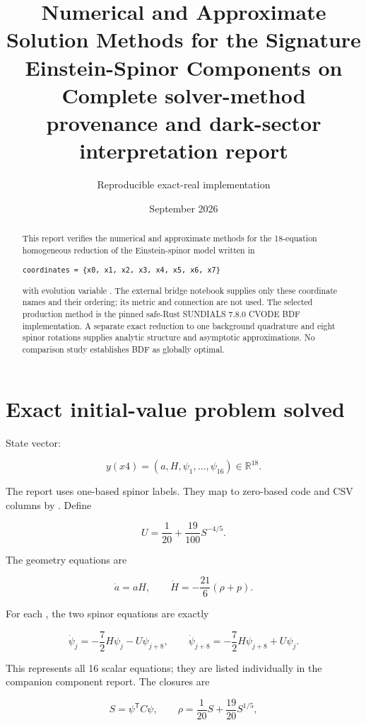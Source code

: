 \documentclass[11pt]{article}
\title{Numerical and Approximate Solution Methods for the Signature \texttt{\detokenize{(4,4)}} Einstein-Spinor Components on \texttt{\detokenize{{x0,...,x7}}}\\[0.5em]\large Complete solver-method provenance and dark-sector interpretation report}
\author{Reproducible exact-real implementation}
\date{September 2026}
\begin{document}
\maketitle
\tableofcontents
\newpage
\begin{abstract}
This report verifies the numerical and approximate methods for the 18-equation homogeneous reduction of the Einstein-spinor model written in

\begin{Verbatim}[fontsize=\small]
coordinates = {x0, x1, x2, x3, x4, x5, x6, x7}
\end{Verbatim}

with evolution variable \texttt{}. The external bridge notebook supplies only these coordinate names and their ordering; its metric and connection are not used. The selected production method is the pinned safe-Rust SUNDIALS 7.8.0 CVODE BDF implementation. A separate exact reduction to one background quadrature and eight spinor rotations supplies analytic structure and asymptotic approximations. No comparison study establishes BDF as globally optimal.

\end{abstract}

\section{Exact initial-value problem solved}

State vector:

\[
y(x4)=(a,H,\psi_1,\ldots,\psi_{16})\in\mathbb R^{18}.
\]

The report uses one-based spinor labels. They map to zero-based code and CSV columns by \texttt{}. Define

\[
U=\frac1{20}+\frac{19}{100}S^{-4/5}.
\]

The geometry equations are

\[
\dot a=aH,
\qquad
\dot H=-\frac{21}{6}(\rho+p).
\]

For each \texttt{}, the two spinor equations are exactly

\[
\dot\psi_j=-\frac72H\psi_j-U\psi_{j+8},
\qquad
\dot\psi_{j+8}=-\frac72H\psi_{j+8}+U\psi_j.
\]

This represents all 16 scalar equations; they are listed individually in the companion component report. The closures are

\[
S=\psi^{\mathsf T}C\psi,
\qquad
\rho=\frac{1}{20}S+\frac{19}{20}S^{1/5},
\]
\end{document}

